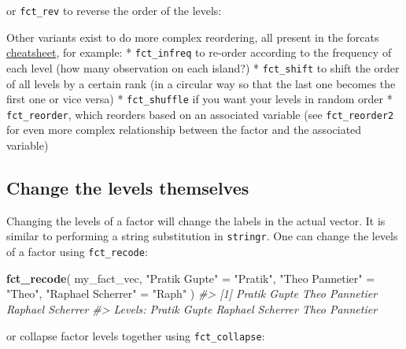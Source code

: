 \documentclass[]{book}
\newenvironment{Shaded}{}{}
\newcommand{\CommentTok}[1]{\textcolor[rgb]{0.38,0.63,0.69}{\textit{#1}}}
\newcommand{\KeywordTok}[1]{\textcolor[rgb]{0.00,0.44,0.13}{\textbf{#1}}}
\newcommand{\NormalTok}[1]{#1}
\newcommand{\OperatorTok}[1]{\textcolor[rgb]{0.40,0.40,0.40}{#1}}
\newcommand{\StringTok}[1]{\textcolor[rgb]{0.25,0.44,0.63}{#1}}
\begin{document}
or \texttt{fct\_rev} to reverse the order of the levels:

\begin{Shaded}
\end{Shaded}

Other variants exist to do more complex reordering, all present in the forcats \href{https://rstudio.com/resources/cheatsheets/}{cheatsheet}, for example:
* \texttt{fct\_infreq} to re-order according to the frequency of each level (how many observation on each island?)
* \texttt{fct\_shift} to shift the order of all levels by a certain rank (in a circular way so that the last one becomes the first one or vice versa)
* \texttt{fct\_shuffle} if you want your levels in random order
* \texttt{fct\_reorder}, which reorders based on an associated variable (see \texttt{fct\_reorder2} for even more complex relationship between the factor and the associated variable)

\hypertarget{change-the-levels-themselves}{%
\subsection{Change the levels themselves}\label{change-the-levels-themselves}}

Changing the levels of a factor will change the labels in the actual vector. It is similar to performing a string substitution in \texttt{stringr}. One can change the levels of a factor using \texttt{fct\_recode}:

\begin{Shaded}
\begin{Highlighting}[]
\KeywordTok{fct_recode}\NormalTok{(}
\NormalTok{  my_fact_vec, }
  \StringTok{"Pratik Gupte"}\NormalTok{ =}\StringTok{ "Pratik"}\NormalTok{, }
  \StringTok{"Theo Pannetier"}\NormalTok{ =}\StringTok{ "Theo"}\NormalTok{, }
  \StringTok{"Raphael Scherrer"}\NormalTok{ =}\StringTok{ "Raph"}
\NormalTok{)}
\CommentTok{#> [1] Pratik Gupte     Theo Pannetier   Raphael Scherrer}
\CommentTok{#> Levels: Pratik Gupte Raphael Scherrer Theo Pannetier}
\end{Highlighting}
\end{Shaded}

or collapse factor levels together using \texttt{fct\_collapse}:
\end{document}
